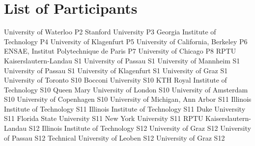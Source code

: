 \chapter{List of Participants}

\setlength{\columnsep}{1cm}

\begin{multicols}{2}

\small\raggedright

{University of Waterloo}
{P2}
{}
{Stanford University}
{P3}
{}
{Georgia Institute of Technology}
{P4}
{}
{University of Klagenfurt}
{P5}
{}
{University of California, Berkeley}
{P6}
{}
{ENSAE, Institut Polytechnique de Paris}
{P7}
{}
{University of Chicago}
{P8}
{}
{RPTU Kaiserslautern-Landau}
{S1}
{}
{University of Passau}
{S1}
{}
{University of Mannheim}
{S1}
{}
{University of Passau}
{S1}
{}
{University of Klagenfurt}
{S1}
{}
{University of Graz}
{S1}
{}
{University of Toronto}
{S10}
{}
{Bocconi University}
{S10}
{}
{KTH Royal Institute of Technology}
{S10}
{}
{Queen Mary University of London}
{S10}
{}
{University of Amsterdam}
{S10}
{}
{University of Copenhagen}
{S10}
{}
{University of Michigan, Ann Arbor}
{S11}
{}
{Illinois Institute of Technology}
{S11}
{}
{Illinois Institute of Technology}
{S11}
{}
{Duke University}
{S11}
{}
{Florida State University}
{S11}
{}
{New York University}
{S11}
{}
{RPTU Kaiserslautern-Landau}
{S12}
{}
{Illinois Institute of Technology}
{S12}
{}
{University of Graz}
{S12}
{}
{University of Passau}
{S12}
{}
{Technical University of Leoben}
{S12}
{}
{University of Graz}
{S12}
{}

\end{multicols}
